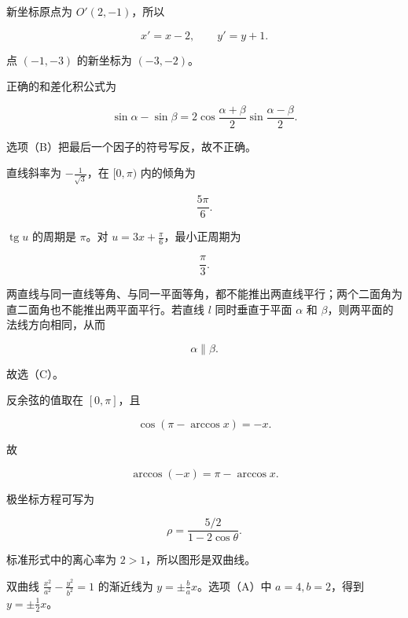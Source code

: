 \begin{answer}
新坐标原点为 $O'(2,-1)$，所以

\nopagebreak[4]
\[
x'=x-2,\qquad y'=y+1.
\]

点 $(-1,-3)$ 的新坐标为 $(-3,-2)$。


正确的和差化积公式为

\nopagebreak[4]
\[
\sin\alpha-\sin\beta
=2\cos\frac{\alpha+\beta}{2}\sin\frac{\alpha-\beta}{2}.
\]

选项（B）把最后一个因子的符号写反，故不正确。


直线斜率为 $-\frac1{\sqrt3}$，在 $[0,\pi)$ 内的倾角为

\nopagebreak[4]
\[
\frac{5\pi}{6}.
\]


$\operatorname{tg}u$ 的周期是 $\pi$。对 $u=3x+\frac\pi6$，最小正周期为

\nopagebreak[4]
\[
\frac\pi3.
\]


两直线与同一直线等角、与同一平面等角，都不能推出两直线平行；两个二面角为直二面角也不能推出两平面平行。若直线 $l$ 同时垂直于平面 $\alpha$ 和 $\beta$，则两平面的法线方向相同，从而

\nopagebreak[4]
\[
\alpha\parallel\beta.
\]

故选（C）。


反余弦的值取在 $[0,\pi]$，且

\nopagebreak[4]
\[
\cos(\pi-\arccos x)=-x.
\]

故

\nopagebreak[4]
\[
\arccos(-x)=\pi-\arccos x.
\]


极坐标方程可写为

\nopagebreak[4]
\[
\rho=\frac{5/2}{1-2\cos\theta}.
\]

标准形式中的离心率为 $2>1$，所以图形是双曲线。


双曲线 $\frac{x^2}{a^2}-\frac{y^2}{b^2}=1$ 的渐近线为 $y=\pm\frac ba x$。选项（A）中 $a=4,b=2$，得到 $y=\pm\frac12x$。



\end{answer}

